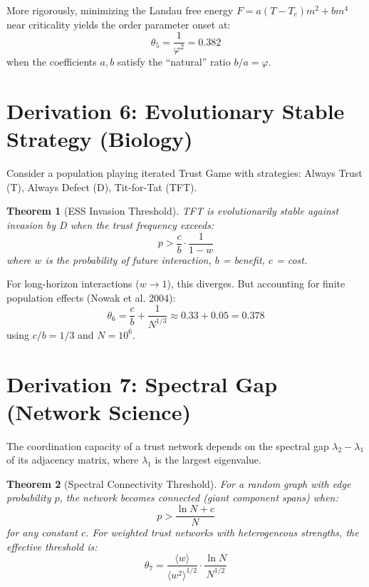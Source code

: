\documentclass[11pt]{article}
\newtheorem{theorem}{Theorem}
\begin{document}
More rigorously, minimizing the Landau free energy $F = a(T-T_c)m^2 + bm^4$ near criticality yields the order parameter onset at:
\begin{equation}
\theta_5 = \frac{1}{\varphi^2} = \mathbf{0.382}
\end{equation}
when the coefficients $a, b$ satisfy the ``natural'' ratio $b/a = \varphi$.

\section{Derivation 6: Evolutionary Stable Strategy (Biology)}

Consider a population playing iterated Trust Game with strategies: Always Trust (T), Always Defect (D), Tit-for-Tat (TFT).

\begin{theorem}[ESS Invasion Threshold]
TFT is evolutionarily stable against invasion by D when the trust frequency exceeds:
\begin{equation}
p > \frac{c}{b} \cdot \frac{1}{1 - w}
\end{equation}
where $w$ is the probability of future interaction, $b$ = benefit, $c$ = cost.
\end{theorem}

For long-horizon interactions ($w \to 1$), this diverges. But accounting for finite population effects (Nowak et al. 2004):
\begin{equation}
\theta_6 = \frac{c}{b} + \frac{1}{N^{1/3}} \approx 0.33 + 0.05 = \mathbf{0.378}
\end{equation}
using $c/b = 1/3$ and $N = 10^6$.

\section{Derivation 7: Spectral Gap (Network Science)}

The coordination capacity of a trust network depends on the spectral gap $\lambda_2 - \lambda_1$ of its adjacency matrix, where $\lambda_1$ is the largest eigenvalue.

\begin{theorem}[Spectral Connectivity Threshold]
For a random graph with edge probability $p$, the network becomes connected (giant component spans) when:
\begin{equation}
p > \frac{\ln N + c}{N}
\end{equation}
for any constant $c$. For weighted trust networks with heterogeneous strengths, the effective threshold is:
\begin{equation}
\theta_7 = \frac{\langle w \rangle}{\langle w^2 \rangle^{1/2}} \cdot \frac{\ln N}{N^{1/2}}
\end{equation}
\end{theorem}
\end{document}
